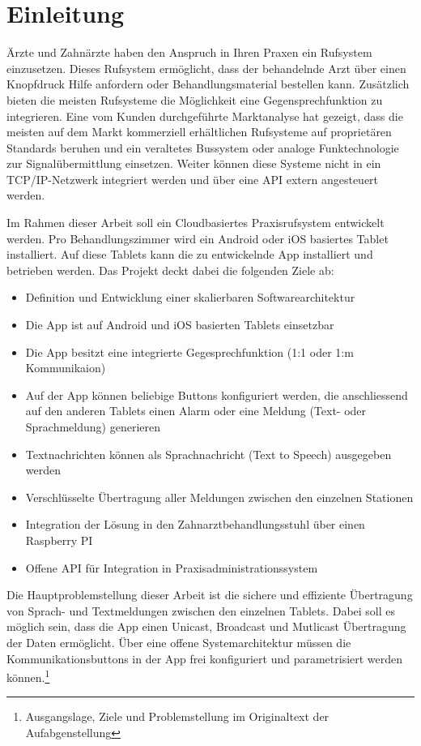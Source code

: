 \section{Einleitung}\label{sec:einleitung}

Ärzte und Zahnärzte haben den Anspruch in Ihren Praxen ein Rufsystem einzusetzen.
Dieses Rufsystem ermöglicht, dass der behandelnde Arzt über einen Knopfdruck Hilfe anfordern oder Behandlungsmaterial bestellen kann.
Zusätzlich bieten die meisten Rufsysteme die Möglichkeit eine Gegensprechfunktion zu integrieren.
Eine vom Kunden durchgeführte Marktanalyse hat gezeigt, dass die meisten auf dem Markt kommerziell erhältlichen Rufsysteme auf proprietären Standards beruhen und ein veraltetes Bussystem oder analoge Funktechnologie zur Signalübermittlung einsetzen.
Weiter können diese Systeme nicht in ein TCP/IP-Netzwerk integriert werden und über eine API extern angesteuert werden.

Im Rahmen dieser Arbeit soll ein Cloudbasiertes Praxisrufsystem entwickelt werden.
Pro Behandlungszimmer wird ein Android oder iOS basiertes Tablet installiert.
Auf diese Tablets kann die zu entwickelnde App installiert und betrieben werden.
Das Projekt deckt dabei die folgenden Ziele ab:

\begin{itemize}
    \item Definition und Entwicklung einer skalierbaren Softwarearchitektur
    \item Die App ist auf Android und iOS basierten Tablets einsetzbar
    \item Die App besitzt eine integrierte Gegesprechfunktion (1:1 oder 1:m Kommunikaion)
    \item Auf der App können beliebige Buttons konfiguriert werden, die anschliessend auf den anderen Tablets einen Alarm oder eine Meldung (Text- oder Sprachmeldung) generieren
    \item Textnachrichten können als Sprachnachricht (Text to Speech) ausgegeben werden
    \item Verschlüsselte Übertragung aller Meldungen zwischen den einzelnen Stationen
    \item Integration der Lösung in den Zahnarztbehandlungsstuhl über einen Raspberry PI
    \item Offene API für Integration in Praxisadministrationssystem
\end{itemize}

Die Hauptproblemstellung dieser Arbeit ist die sichere und effiziente Übertragung von Sprach- und Textmeldungen zwischen den einzelnen Tablets.
Dabei soll es möglich sein, dass die App einen Unicast, Broadcast und Mutlicast Übertragung der Daten ermöglicht.
Über eine offene Systemarchitektur müssen die Kommunikationsbuttons in der App frei konfiguriert und parametrisiert werden können.\cite{aufgabenstellung}\footnote{Ausgangslage, Ziele und Problemstellung im Originaltext der Aufabgenstellung}

